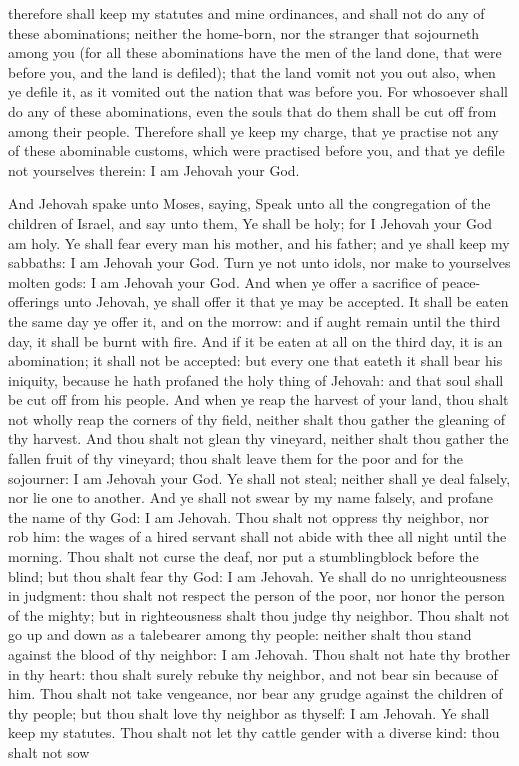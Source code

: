 therefore shall keep my statutes and mine ordinances, and shall not do any of these abominations; neither the home-born, nor the stranger that sojourneth among you (for all these abominations have the men of the land done, that were before you, and the land is defiled); that the land vomit not you out also, when ye defile it, as it vomited out the nation that was before you. For whosoever shall do any of these abominations, even the souls that do them shall be cut off from among their people. Therefore shall ye keep my charge, that ye practise not any of these abominable customs, which were practised before you, and that ye defile not yourselves therein: I am Jehovah your God. 

And Jehovah spake unto Moses, saying, Speak unto all the congregation of the children of Israel, and say unto them, Ye shall be holy; for I Jehovah your God am holy. Ye shall fear every man his mother, and his father; and ye shall keep my sabbaths: I am Jehovah your God. Turn ye not unto idols, nor make to yourselves molten gods: I am Jehovah your God.  And when ye offer a sacrifice of peace-offerings unto Jehovah, ye shall offer it that ye may be accepted. It shall be eaten the same day ye offer it, and on the morrow: and if aught remain until the third day, it shall be burnt with fire. And if it be eaten at all on the third day, it is an abomination; it shall not be accepted: but every one that eateth it shall bear his iniquity, because he hath profaned the holy thing of Jehovah: and that soul shall be cut off from his people.  And when ye reap the harvest of your land, thou shalt not wholly reap the corners of thy field, neither shalt thou gather the gleaning of thy harvest. And thou shalt not glean thy vineyard, neither shalt thou gather the fallen fruit of thy vineyard; thou shalt leave them for the poor and for the sojourner: I am Jehovah your God.  Ye shall not steal; neither shall ye deal falsely, nor lie one to another. And ye shall not swear by my name falsely, and profane the name of thy God: I am Jehovah.  Thou shalt not oppress thy neighbor, nor rob him: the wages of a hired servant shall not abide with thee all night until the morning. Thou shalt not curse the deaf, nor put a stumblingblock before the blind; but thou shalt fear thy God: I am Jehovah.  Ye shall do no unrighteousness in judgment: thou shalt not respect the person of the poor, nor honor the person of the mighty; but in righteousness shalt thou judge thy neighbor. Thou shalt not go up and down as a talebearer among thy people: neither shalt thou stand against the blood of thy neighbor: I am Jehovah.  Thou shalt not hate thy brother in thy heart: thou shalt surely rebuke thy neighbor, and not bear sin because of him. Thou shalt not take vengeance, nor bear any grudge against the children of thy people; but thou shalt love thy neighbor as thyself: I am Jehovah.  Ye shall keep my statutes. Thou shalt not let thy cattle gender with a diverse kind: thou shalt not sow 